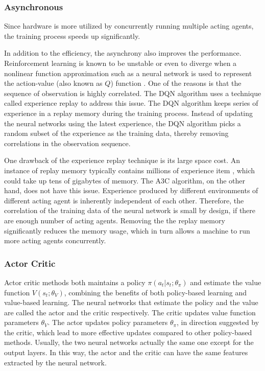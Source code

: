         \subsubsection{Asynchronous}

            Since hardware is more utilized by concurrently running multiple acting agents,
            the training process speeds up significantly.

            In addition to the efficiency, the asynchrony also improves the performance.
            Reinforcement learning is known to be unstable or even to diverge
            when a nonlinear function approximation such as a neural network is used to represent the action-value
            (also known as $Q$) function \cite{tsitsiklis_analysis_1997}.
            One of the reasons is that the sequence of observation is highly correlated.
            The DQN algorithm uses a technique called experience replay to address this issue.
            The DQN algorithm keeps series of experience in a replay memory during the training process.
            Instead of updating the neural networks using the latest experience,
            the DQN algorithm picks a random subset of the experience as the training data,
            thereby removing correlations in the observation sequence.

            One drawback of the experience replay technique is its large space cost.
            An instance of replay memory typically contains millions of experience item \cite{mnih_human-level_2015},
            which could take up tens of gigabytes of memory.
            The A3C algorithm, on the other hand, does not have this issue.
            Experience produced by different environments of different acting agent
            is inherently independent of each other.
            Therefore, the correlation of the training data of the neural network is small by design,
            if there are enough number of acting agents.
            Removing the the replay memory significantly reduces the memory usage,
            which in turn allows a machine to run more acting agents concurrently.

        \subsubsection{Actor Critic}

            Actor critic methods both maintains a policy $\pi(a_t|s_t;\theta_{\pi})$ and 
            estimate the value function $V(s_t;\theta_V)$,
            combining the benefits of both policy-based learning and value-based learning.
            The neural networks that estimate the policy and the value are called the actor and the critic respectively.
            The critic updates value function parameters $\theta_V$.
            The actor updates policy parameters $\theta_{\pi}$, in direction suggested by the critic,
            which lead to more effective updates compared to other policy-based methods.
            Usually, the two neural networks actually the same one except for the output layers.
            In this way, the actor and the critic can have the same features extracted by the neural network.

